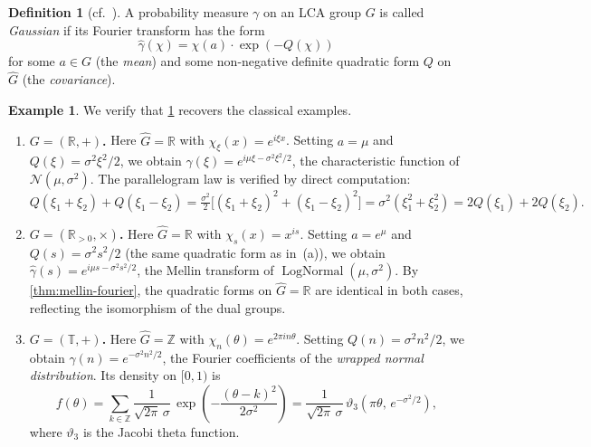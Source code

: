\documentclass[12pt]{amsart}
\theoremstyle{definition}
\newtheorem{definition}[theorem]{Definition}
\newtheorem{example}[theorem]{Example}
\theoremstyle{remark}
\newcommand{\R}{\mathbb{R}}
\newcommand{\Rpos}{\mathbb{R}_{>0}}
\newcommand{\bT}{\mathbb{T}}
\newcommand{\Z}{\mathbb{Z}}
\newcommand{\cN}{\mathcal{N}}
\begin{document}
\begin{definition}[{cf.\ \cite[Definition~VI.5.1]{Parthasarathy}}]\label{def:gaussian-lca}
A probability measure $\gamma$ on an LCA group $G$ is called \emph{Gaussian} if its Fourier transform has the form
\[
\widehat{\gamma}(\chi) = \chi(a) \cdot \exp\!\left(-Q(\chi)\right)
\]
for some $a \in G$ (the \emph{mean}) and some non-negative definite quadratic form $Q$ on $\widehat{G}$ (the \emph{covariance}).
\end{definition}

\begin{example}\label{ex:gaussian-instances}
We verify that \cref{def:gaussian-lca} recovers the classical examples.
\begin{enumerate}[label=(\alph*)]
\item \textbf{$G = (\R, +)$.} Here $\widehat{G} = \R$ with $\chi_\xi(x) = e^{i\xi x}$. Setting $a = \mu$ and $Q(\xi) = \sigma^2\xi^2/2$, we obtain $\widehat{\gamma}(\xi) = e^{i\mu\xi - \sigma^2\xi^2/2}$, the characteristic function of $\cN(\mu, \sigma^2)$. The parallelogram law is verified by direct computation:
\[
Q(\xi_1 + \xi_2) + Q(\xi_1 - \xi_2) = \tfrac{\sigma^2}{2}\bigl[(\xi_1+\xi_2)^2 + (\xi_1-\xi_2)^2\bigr] = \sigma^2(\xi_1^2 + \xi_2^2) = 2Q(\xi_1) + 2Q(\xi_2).
\]

\item \textbf{$G = (\Rpos, \times)$.} Here $\widehat{G} = \R$ with $\chi_s(x) = x^{is}$. Setting $a = e^\mu$ and $Q(s) = \sigma^2 s^2/2$ (the same quadratic form as in~(a)), we obtain $\widehat{\gamma}(s) = e^{i\mu s - \sigma^2 s^2/2}$, the Mellin transform of $\operatorname{LogNormal}(\mu, \sigma^2)$. By \cref{thm:mellin-fourier}, the quadratic forms on $\widehat{G} = \R$ are identical in both cases, reflecting the isomorphism of the dual groups.

\item \textbf{$G = (\bT, +)$.} Here $\widehat{G} = \Z$ with $\chi_n(\theta) = e^{2\pi i n\theta}$. Setting $Q(n) = \sigma^2 n^2/2$, we obtain $\widehat{\gamma}(n) = e^{-\sigma^2 n^2/2}$, the Fourier coefficients of the \emph{wrapped normal distribution}. Its density on $[0, 1)$ is
\[
f(\theta) = \sum_{k \in \Z} \frac{1}{\sqrt{2\pi}\,\sigma}\, \exp\!\left(-\frac{(\theta - k)^2}{2\sigma^2}\right) = \frac{1}{\sqrt{2\pi}\,\sigma}\,\vartheta_3\!\left(\pi\theta,\, e^{-\sigma^2/2}\right),
\]
where $\vartheta_3$ is the Jacobi theta function.
\end{enumerate}
\end{example}
\end{document}
